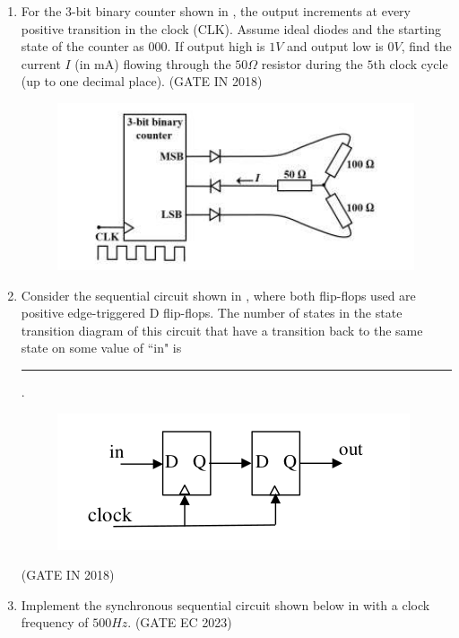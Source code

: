 \begin{enumerate}[label=\arabic*.,ref=\theenumi]
\item  
\label{prob:gate IN 17}
For the $3$-bit binary counter shown in 
, the output increments at every positive 
transition in the clock (CLK). Assume ideal diodes and the starting state of the counter as 
$000$. If output high is $1 V$ and output low is $0 V$, find the current $I$ (in mA) flowing through the 
$50 \Omega$ resistor during the $5$th clock cycle (up to one decimal place).
\hfill(GATE IN 2018)
\begin{figure}[H]
\centering
\includegraphics[width=0.75\columnwidth]{ide/7474/figs/pic.png}
\caption{}
\label{fig:lcd}
\end{figure}
\item
\label{prob:gate CS 22}
Consider the sequential circuit shown in , where both flip-flops used are positive
    edge-triggered D flip-flops.
The number of states in the state transition diagram of this circuit that have a transition back to the same state on some value of ``in" is \rule{1cm}{0.1pt}.
\begin{figure}[H]
        \centering      
        \includegraphics[width=0.75\columnwidth]{ide/7474/figs/wert.jpg}
        \caption{}    
        \label{fig:wert}
    \end{figure}
%
   \hfill(GATE IN 2018)
   \item Implement the synchronous sequential circuit shown below 
in 
	   with a clock frequency of $500 Hz$. 
\hfill(GATE EC 2023)
\label{prob:GATE EC 2023}
	\begin{figure}[H]
    \centering
\end{figure}
\end{enumerate}
